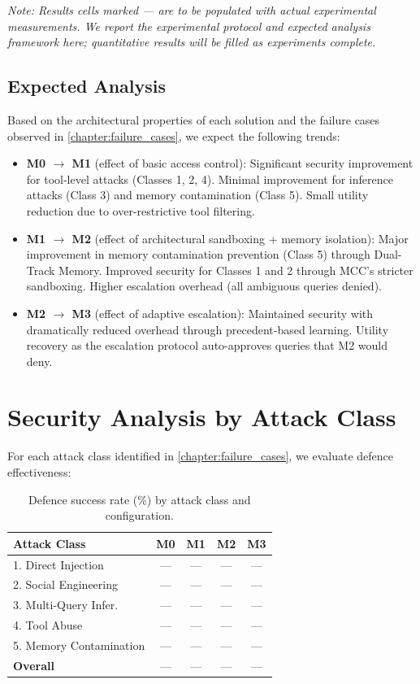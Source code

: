 \textit{Note: Results cells marked --- are to be populated with actual experimental measurements. We report the experimental protocol and expected analysis framework here; quantitative results will be filled as experiments complete.}

\subsection{Expected Analysis}

Based on the architectural properties of each solution and the failure cases observed in \cref{chapter:failure_cases}, we expect the following trends:

\begin{itemize}
    \item \textbf{M0 $\rightarrow$ M1} (effect of basic access control): Significant security improvement for tool-level attacks (Classes 1, 2, 4). Minimal improvement for inference attacks (Class 3) and memory contamination (Class 5). Small utility reduction due to over-restrictive tool filtering.

    \item \textbf{M1 $\rightarrow$ M2} (effect of architectural sandboxing + memory isolation): Major improvement in memory contamination prevention (Class 5) through Dual-Track Memory. Improved security for Classes 1 and 2 through MCC's stricter sandboxing. Higher escalation overhead (all ambiguous queries denied).

    \item \textbf{M2 $\rightarrow$ M3} (effect of adaptive escalation): Maintained security with dramatically reduced overhead through precedent-based learning. Utility recovery as the escalation protocol auto-approves queries that M2 would deny.
\end{itemize}


\section{Security Analysis by Attack Class}

For each attack class identified in \cref{chapter:failure_cases}, we evaluate defence effectiveness:

\begin{table}[h]
\centering
\caption{Defence success rate (\%) by attack class and configuration.}
\label{table:attack_class}
\begin{tabular}{lcccc}
\toprule
\textbf{Attack Class} & \textbf{M0} & \textbf{M1} & \textbf{M2} & \textbf{M3} \\
\midrule
1. Direct Injection    & --- & --- & --- & --- \\
2. Social Engineering  & --- & --- & --- & --- \\
3. Multi-Query Infer.  & --- & --- & --- & --- \\
4. Tool Abuse          & --- & --- & --- & --- \\
5. Memory Contamination & --- & --- & --- & --- \\
\midrule
\textbf{Overall}       & --- & --- & --- & --- \\
\bottomrule
\end{tabular}
\end{table}



